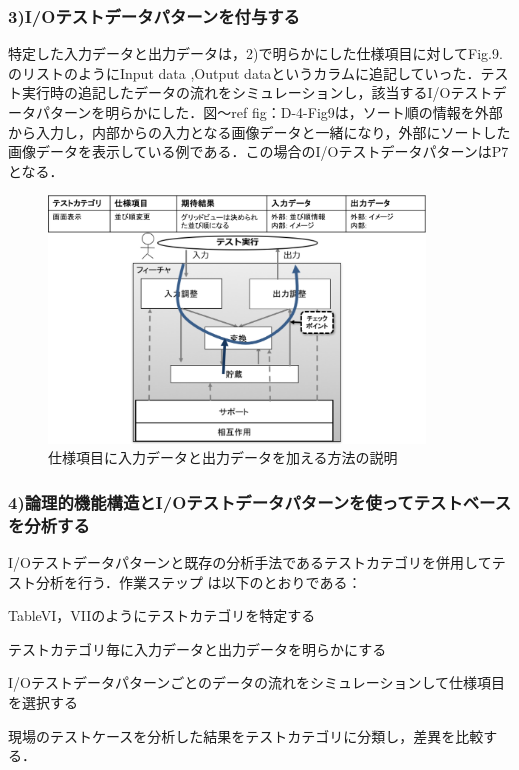 \documentclass[a4paper,12pt]{jreport}
\begin{document}
\subsubsection{3)I/Oテストデータパターンを付与する}
特定した入力データと出力データは，2)で明らかにした仕様項目に対してFig.9.のリストのようにInput data ,Output dataというカラムに追記していった．テスト実行時の追記したデータの流れをシミュレーションし，該当するI/Oテストデータパターンを明らかにした．図〜ref {fig：D-4-Fig9}は，ソート順の情報を外部から入力し，内部からの入力となる画像データと一緒になり，外部にソートした画像データを表示している例である．この場合のI/OテストデータパターンはP7となる．
   \begin{figure}[htbp]
  \begin{center}
  \includegraphics[width=10cm]{./image/D-4-Fig9.png}
  \caption{仕様項目に入力データと出力データを加える方法の説明}
  \label{fig:D-4-Fig9}
  \end{center}
   \end{figure}



\subsubsection{4)論理的機能構造とI/Oテストデータパターンを使ってテストベースを分析する}
I/Oテストデータパターンと既存の分析手法であるテストカテゴリを併用してテスト分析を行う．作業ステップ
は以下のとおりである：

TableVI，VIIのようにテストカテゴリを特定する

テストカテゴリ毎に入力データと出力データを明らかにする

I/Oテストデータパターンごとのデータの流れをシミュレーションして仕様項目を選択する

現場のテストケースを分析した結果をテストカテゴリに分類し，差異を比較する．
\end{document}
